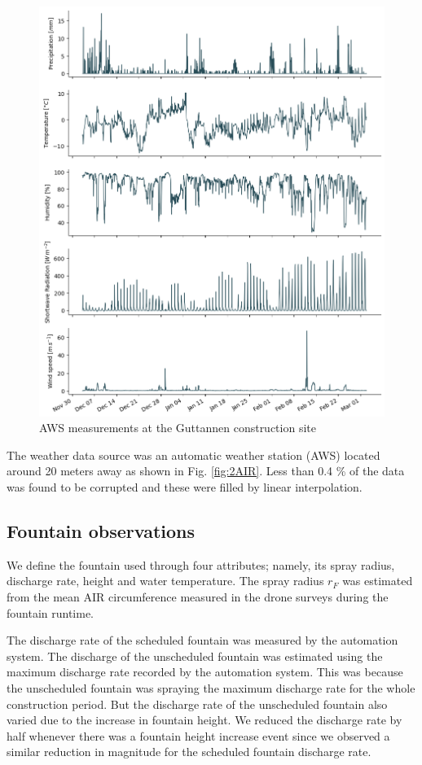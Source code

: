 \documentclass[tc, manuscript]{copernicus}
\begin{document}
\begin{figure}[t]
\includegraphics[width=12cm]{Figures/input.png}
\caption{AWS measurements at the Guttannen construction site}
\label{fig:aws} 
\end{figure}

The weather data source was an automatic weather station (AWS) located around 20 meters away as shown in Fig.
\ref{fig:2AIR}. Less than 0.4 \% of the data was found to be corrupted and these were filled by linear
interpolation. 

\subsection{Fountain observations}

We define the fountain used through four attributes; namely, its spray radius, discharge rate, height and water
temperature. The spray radius $r_F$ was estimated from the mean AIR circumference
measured in the drone surveys during the fountain runtime. 

The discharge rate of the scheduled fountain was measured by the automation system. The discharge of the
unscheduled fountain was estimated using the maximum discharge rate recorded by the automation system. This was
because the unscheduled fountain was spraying the maximum discharge rate for the whole construction period. But
the discharge rate of the unscheduled fountain also varied due to the increase in fountain height. We reduced
the discharge rate by half whenever there was a fountain height increase event since we observed a similar
reduction in magnitude for the scheduled fountain discharge rate.
\end{document}
